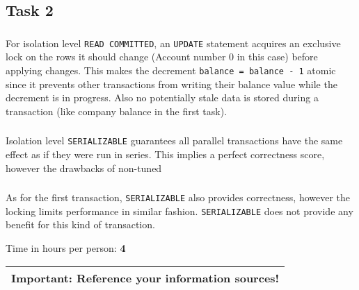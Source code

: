 \documentclass[11pt]{scrartcl}
\begin{document}
\subsection*{Task 2}

\subsubsection*{}
For isolation level {\tt\small READ COMMITTED}, an {\tt\small UPDATE}
statement acquires an exclusive lock on the rows it should change (Account number 0
in this case) before applying changes.
This makes the decrement {\tt\small balance = balance - 1} atomic since it
prevents other transactions from writing their balance value while the decrement
is in progress.
Also no potentially stale data is stored during a transaction (like company balance
in the first task).

\subsubsection*{}
Isolation level {\tt\small SERIALIZABLE} guarantees all parallel transactions
have the same effect as if they were run in series. This implies a perfect correctness
score, however the drawbacks of non-tuned 

\subsubsection*{}
As for the first transaction, {\tt\small SERIALIZABLE} also provides correctness,
however the locking limits performance in similar fashion. {\tt\small SERIALIZABLE}
does not provide any benefit for this kind of transaction.

\bigskip

\noindent Time in hours per person: {\bf 4}

\bigskip

\begin{center}
  \begin{tabular}{c}
    \hline
    {\bf Important:} Reference your information sources!
    \\\hline
  \end{tabular}
\end{center}
\end{document}
